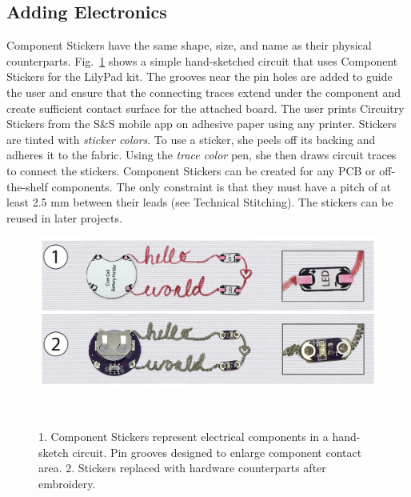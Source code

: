 \documentclass[header.tex]{subfiles}
\begin{document}
\subsection{Adding Electronics}

Component Stickers have the same shape, size, and name as their physical counterparts. Fig.\ \ref{fig:ComponentStickers} shows a simple hand-sketched circuit that uses Component Stickers for the LilyPad kit. 
The grooves near the pin holes are added to guide the user and ensure that the connecting traces extend under the component and create sufficient contact surface for the attached board. 
The user prints Circuitry Stickers from the S\&S mobile app on adhesive paper using any printer. Stickers are tinted with \textit{sticker colors}. To use a sticker, she peels off its backing and adheres it to the fabric. %
Using the \textit{trace color} pen, she then draws circuit traces to connect the stickers. 
Component Stickers can be created for any PCB or off-the-shelf components. The only constraint is that they must have a pitch of at least 2.5 mm between their leads (see Technical Stitching). The stickers can be reused in later projects.


\begin{figure}[t]
\centering
  \includegraphics[width=0.85\columnwidth]{figures/ComponentStickers.png}
  \caption{1. Component Stickers represent electrical components in a hand-sketch circuit. Pin grooves designed to enlarge component contact area. 2. Stickers replaced with hardware counterparts after embroidery.}~\label{fig:ComponentStickers}
  \vspace{-2.2em}
\end{figure}
\end{document}
